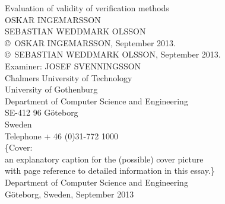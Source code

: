 {\setlength{\parindent}{0cm}


{\Large Evaluation of validity of verification methods}\\

{OSKAR INGEMARSSON}\\
{SEBASTIAN WEDDMARK OLSSON}\\

\copyright ~OSKAR INGEMARSSON, September 2013.\\
\copyright ~SEBASTIAN WEDDMARK OLSSON, September 2013.\\

Examiner: JOSEF SVENNINGSSON\\

Chalmers University of Technology\\
University of Gothenburg\\
Department of Computer Science and Engineering\\
SE-412 96 G\"{o}teborg\\
Sweden\\
Telephone + 46 (0)31-772 1000\\
\vfill
\{Cover:\\
an explanatory caption for the (possible) cover picture\\
with page reference to detailed information in this essay.\}\\

Department of Computer Science and Engineering\\
G\"{o}teborg, Sweden, September 2013
}
\newpage
{}
